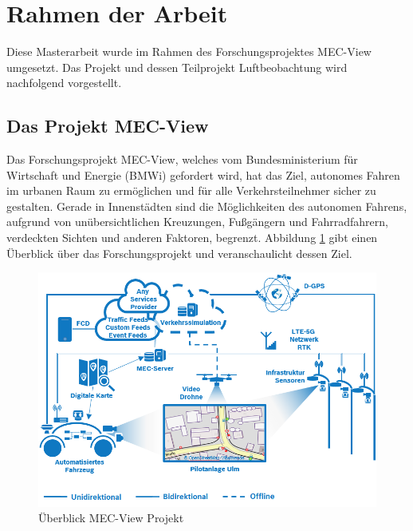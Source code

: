 \section{Rahmen der Arbeit}
\label{sec:rahmen_arbeit}

Diese Masterarbeit wurde im Rahmen des Forschungsprojektes MEC-View umgesetzt. Das Projekt und dessen
Teilprojekt Luftbeobachtung wird nachfolgend vorgestellt.

\subsection{Das Projekt MEC-View}
\label{sec:mec_view}

Das Forschungsprojekt MEC-View, welches vom Bundesministerium für Wirtschaft und Energie (BMWi) gefordert wird,
hat das Ziel, autonomes Fahren im urbanen Raum zu ermöglichen und für alle Verkehrsteilnehmer sicher zu gestalten.
Gerade in Innenstädten sind die Möglichkeiten des autonomen Fahrens, aufgrund von unübersichtlichen Kreuzungen,
Fußgängern und Fahrradfahrern, verdeckten Sichten und anderen Faktoren, begrenzt.
Abbildung \ref{fig:intro_mec_view_arch} gibt einen Überblick über das Forschungsprojekt und veranschaulicht dessen Ziel.

\begin{figure}[H]
\centering
    \includegraphics[width=0.7\linewidth]{resources/img/mec_view_arch}
\caption[Überblick MEC-View Projekt]{Überblick MEC-View Projekt \cite[]{mecViewWeb}}
\label{fig:intro_mec_view_arch}
\end{figure}

